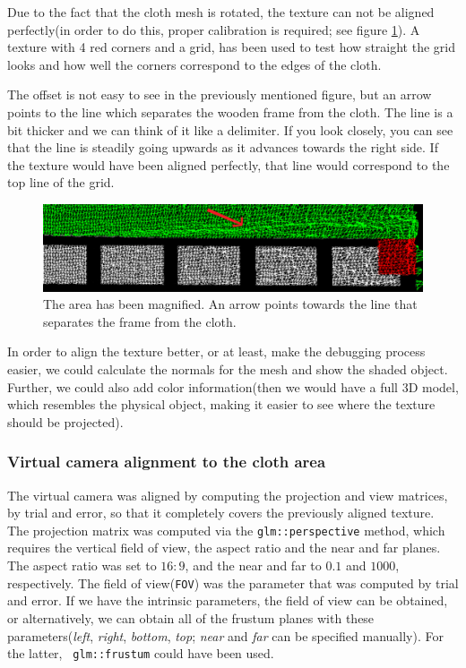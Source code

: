 \documentclass[]{article}
\begin{document}
Due to the fact that the cloth mesh is rotated, the texture can not be aligned perfectly(in order to do this, proper calibration is required; see figure \ref{fig:MisalignmentArea}). A texture with 4 red corners and a grid, has been used to test how straight the grid looks and how well the corners correspond to the edges of the cloth. 

The offset is not easy to see in the previously mentioned figure, but an arrow points to the line which separates the wooden frame from the cloth. The line is a bit thicker and we can think of it like a delimiter. If you look closely, you can see that the line is steadily going upwards as it advances towards the right side. If the texture would have been aligned perfectly, that line would correspond to the top line of the grid.



\begin{figure}[!hbtp]
    \centering
    \includegraphics[width=1.0\textwidth]{figures/MisalignmentArea3.png}
    \caption{The area has been magnified. An arrow points towards the line that separates the frame from the cloth.}
    \label{fig:MisalignmentArea}
\end{figure}

In order to align the texture better, or at least, make the debugging process easier, we could calculate the normals for the mesh and show the shaded object. Further, we could also add color information(then we would have a full 3D model, which resembles the physical object, making it easier to see where the texture should be projected).

\subsubsection{Virtual camera alignment to the cloth area}
\label{sec:VirtualCameraAlignmentToClothArea}

The virtual camera was aligned by computing the projection and view matrices, by trial and error, so that it completely covers the previously aligned texture. The projection matrix was computed via the \verb|glm::perspective| method, which requires the vertical field of view, the aspect ratio and the near and far planes. The aspect ratio was set to $16:9$, and the near and far to $0.1$ and $1000$, respectively. The field of view(\verb|FOV|) was the parameter that was computed by trial and error. If we have the intrinsic parameters, the field of view can be obtained, or alternatively, we can obtain all of the frustum planes with these parameters(\textit{left}, \textit{right}, \textit{bottom}, \textit{top}; \textit{near} and \textit{far} can be specified manually). For the latter, \verb| glm::frustum| could have been used.
\end{document}
